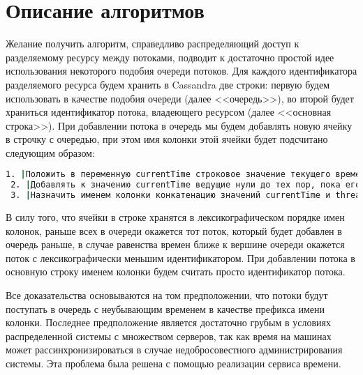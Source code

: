 \section{Описание алгоритмов}

Желание получить алгоритм, справедливо распределяющий доступ к разделяемому ресурсу между потоками, подводит к достаточно простой идее использования некоторого подобия очереди потоков.
Для каждого идентификатора разделяемого ресурса будем хранить в Cassandra две строки: первую будем использовать в качестве подобия очереди (далее <<очередь>>), во второй будет храниться идентификатор потока, владеющего ресурсом (далее <<основная строка>>).
При добавлении потока в очередь мы будем добавлять новую ячейку в строчку с очередью, при этом имя колонки этой ячейки будет подсчитано следующим образом:

\begin{lstlisting}[language=csh,caption={Определение имени колонки для ячейки в очереди}]
 1. |Положить в переменную currentTime строковое значение текущего времени в микросекундах|
 2. |Добавлять к значению currentTime ведущие нули до тех пор, пока его длина не станет равной 20|
 3. |Назначить именем колонки конкатенацию значений currentTime и threadId|
\end{lstlisting}

В силу того, что ячейки в строке хранятся в лексикографическом порядке имен колонок, раньше всех в очереди окажется тот поток, который будет добавлен в очередь раньше, в случае равенства времен ближе к вершине очереди окажется поток с лексикографически меньшим идентификатором.
При добавлении потока в основную строку именем колонки будем считать просто идентификатор потока.

Все доказательства основываются на том предположении, что потоки будут поступать в очередь с неубывающим временем в качестве префикса имени колонки. Последнее предположение является достаточно грубым в условиях распределенной системы с множеством серверов, так как время на машинах может рассинхронизироваться в случае недобросовестного администрирования системы. Эта проблема была решена с помощью реализации сервиса времени.









